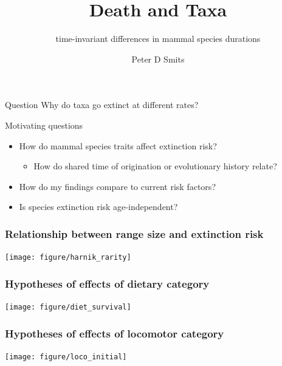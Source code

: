 \documentclass{beamer}
\title{Death and Taxa}
\subtitle{time-invariant differences in mammal species durations}
\author{Peter D Smits}
\institute{Committee on Evolutionary Biology, University of Chicago}
\begin{document}
\begin{frame}
  \maketitle
\end{frame}

\begin{frame}
  \begin{alertblock}{Question}
    Why do taxa go extinct at different rates?
  \end{alertblock}
\end{frame}

\begin{frame}
  \begin{block}{Motivating questions}
    \begin{itemize}
      \item How do mammal species traits affect extinction risk?
        \begin{itemize}
          \item How do shared time of origination or evolutionary history relate?
        \end{itemize}
      \item How do my findings compare to current risk factors?
      \item Is species extinction risk age-independent?
    \end{itemize}
  \end{block}
\end{frame}

\begin{frame}
  \frametitle{Relationship between range size and extinction risk}
  \begin{center}
    \texttt{[image: figure/harnik\_rarity]}
  \end{center}
  
  \tiny{}
\end{frame}

\begin{frame}
  \frametitle{Hypotheses of effects of dietary category}
  \begin{center}
    \texttt{[image: figure/diet\_survival]}
  \end{center}
\end{frame}

\begin{frame}
  \frametitle{Hypotheses of effects of locomotor category}
  \begin{center}
    \texttt{[image: figure/loco\_initial]}
  \end{center}
\end{frame}
\end{document}
